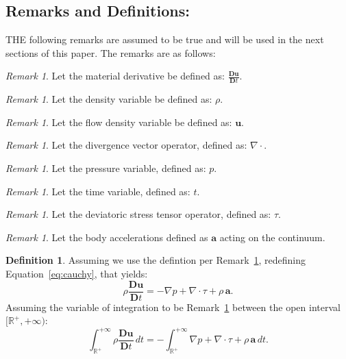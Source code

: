 \documentclass[10pt]{article}
\theoremstyle{plain}
\theoremstyle{definition}
\newtheorem{definition}[theorem]{Definition}
\theoremstyle{remark}
\newtheorem{remark}[theorem]{Remark}
\begin{document}
\subsection{Remarks and Definitions:}

\lettrine[lines=1, lhang=0.1, loversize=0.2]{T}HE following remarks are assumed to be true and will be used in the next sections of this paper. The remarks are as follows:

\begin{remark}
\label{rem:1}
  Let the material derivative be defined as: $\frac{\mathbf{D}\textbf{u}}{\mathbf{D}t}$.
\end{remark}
\begin{remark}
\label{rem:2}
  Let the density variable be defined as: $\rho$.
\end{remark}
\begin{remark}
\label{rem:3}
  Let the flow density variable be defined as: $\textbf{u}$.
\end{remark}
\begin{remark}
\label{rem:4}
  Let the divergence vector operator, defined as: $\nabla \cdot$.
\end{remark}
\begin{remark}
\label{rem:5}
  Let the pressure variable, defined as: $p$.
\end{remark}
\begin{remark}
\label{rem:6}
  Let the time variable, defined as: $t$.
\end{remark}
\begin{remark}
\label{rem:7}
  Let the deviatoric stress tensor operator, defined as: $\tau$.
\end{remark}
\begin{remark}
  Let the body accelerations defined as $\mathbf{a}$ acting on the continuum.
\end{remark}
\begin{definition}
Assuming we use the defintion per Remark~\ref{rem:7}, redefining Equation~\ref{eq:cauchy}, that yields:
\begin{equation}
  \rho \frac{\mathbf{D}\textbf{u}}{\mathbf{D}t} = - \nabla p + \nabla \cdot \tau + \rho \, \textbf{a}.
\end{equation}
Assuming the variable of integration to be Remark~\ref{rem:7} between the open interval $[\mathbb{R}^{+}, +\infty)$:
\begin{equation}
  \label{eq:integral:1}
  \int_{\mathbb{R}^{+}}^{+\infty} \rho \frac{\mathbf{D}\textbf{u}}{\mathbf{D}t} \, dt = - \int_{\mathbb{R}^{+}}^{+\infty} \nabla p + \nabla \cdot \tau + \rho \, \textbf{a} \, dt.
\end{equation}
\end{definition}
\end{document}
